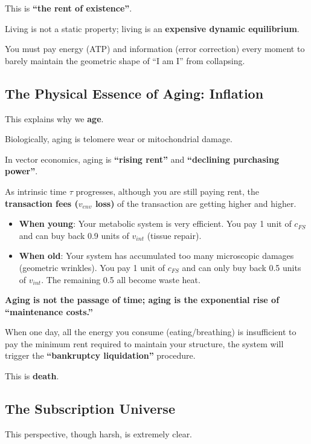 This is \textbf{``the rent of existence''}.

Living is not a static property; living is an \textbf{expensive dynamic equilibrium}.

You must pay energy (ATP) and information (error correction) every moment to barely maintain the geometric shape of ``I am I'' from collapsing.

\subsection{The Physical Essence of Aging: Inflation}

This explains why we \textbf{age}.

Biologically, aging is telomere wear or mitochondrial damage.

In vector economics, aging is \textbf{``rising rent''} and \textbf{``declining purchasing power''}.

As intrinsic time $\tau$ progresses, although you are still paying rent, the \textbf{transaction fees ($v_{env}$ loss)} of the transaction are getting higher and higher.

\begin{itemize}
\item \textbf{When young}: Your metabolic system is very efficient. You pay 1 unit of $c_{FS}$ and can buy back 0.9 units of $v_{int}$ (tissue repair).

\item \textbf{When old}: Your system has accumulated too many microscopic damages (geometric wrinkles). You pay 1 unit of $c_{FS}$ and can only buy back 0.5 units of $v_{int}$. The remaining 0.5 all become waste heat.
\end{itemize}

\textbf{Aging is not the passage of time; aging is the exponential rise of ``maintenance costs.''}

When one day, all the energy you consume (eating/breathing) is insufficient to pay the minimum rent required to maintain your structure, the system will trigger the \textbf{``bankruptcy liquidation''} procedure.

This is \textbf{death}.

\subsection{The Subscription Universe}

This perspective, though harsh, is extremely clear.

